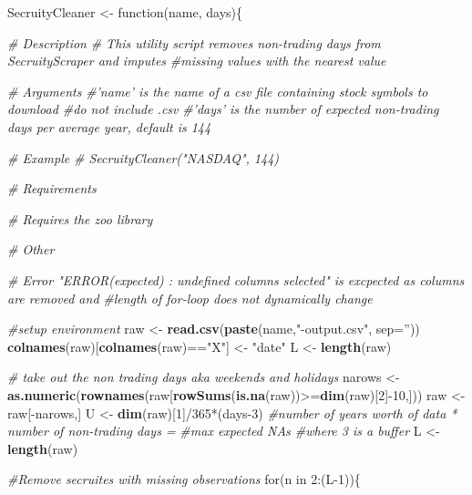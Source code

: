 \documentclass[]{elsarticle} %
\newenvironment{Shaded}{\begin{snugshade}}{\end{snugshade}}
\newcommand{\KeywordTok}[1]{\textcolor[rgb]{0.13,0.29,0.53}{\textbf{{#1}}}}
\newcommand{\DataTypeTok}[1]{\textcolor[rgb]{0.13,0.29,0.53}{{#1}}}
\newcommand{\DecValTok}[1]{\textcolor[rgb]{0.00,0.00,0.81}{{#1}}}
\newcommand{\StringTok}[1]{\textcolor[rgb]{0.31,0.60,0.02}{{#1}}}
\newcommand{\CommentTok}[1]{\textcolor[rgb]{0.56,0.35,0.01}{\textit{{#1}}}}
\newcommand{\NormalTok}[1]{{#1}}
\begin{document}
\begin{Shaded}
\begin{Highlighting}[]
\NormalTok{SecruityCleaner <-}\StringTok{ }\NormalTok{function(name, days)\{}

\CommentTok{# Description}
\CommentTok{# This utility script removes non-trading days from SecruityScraper and imputes }
  \CommentTok{#missing values with the nearest value }

\CommentTok{# Arguments}
\CommentTok{#'name' is the name of a csv file containing stock symbols to download #do not include .csv}
\CommentTok{#'days' is the number of expected non-trading days per average year, default is 144}

\CommentTok{# Example}
\CommentTok{# SecruityCleaner("NASDAQ", 144)}

\CommentTok{# Requirements}

\CommentTok{# Requires the zoo library}

\CommentTok{# Other}

\CommentTok{# Error "ERROR(expected) : undefined columns selected" is excpected as columns are removed and }
  \CommentTok{#length of for-loop does not dynamically change}

\CommentTok{#setup environment}
\NormalTok{raw <-}\StringTok{ }\KeywordTok{read.csv}\NormalTok{(}\KeywordTok{paste}\NormalTok{(name,}\StringTok{"-output.csv"}\NormalTok{, }\DataTypeTok{sep=}\StringTok{''}\NormalTok{))}
\KeywordTok{colnames}\NormalTok{(raw)[}\KeywordTok{colnames}\NormalTok{(raw)==}\StringTok{"X"}\NormalTok{] <-}\StringTok{ "date"}
\NormalTok{L <-}\StringTok{ }\KeywordTok{length}\NormalTok{(raw)}

\CommentTok{# take out the non trading days aka weekends and holidays}
\NormalTok{narows <-}\StringTok{ }\KeywordTok{as.numeric}\NormalTok{(}\KeywordTok{rownames}\NormalTok{(raw[}\KeywordTok{rowSums}\NormalTok{(}\KeywordTok{is.na}\NormalTok{(raw))>=}\KeywordTok{dim}\NormalTok{(raw)[}\DecValTok{2}\NormalTok{]-}\DecValTok{10}\NormalTok{,])) }
\NormalTok{raw <-}\StringTok{ }\NormalTok{raw[-narows,]}
\NormalTok{U <-}\StringTok{ }\KeywordTok{dim}\NormalTok{(raw)[}\DecValTok{1}\NormalTok{]/}\DecValTok{365}\NormalTok{*(days}\DecValTok{-3}\NormalTok{) }\CommentTok{#number of years worth of data * number of non-trading days = }
\CommentTok{#max expected NAs #where 3 is a buffer}
\NormalTok{L <-}\StringTok{ }\KeywordTok{length}\NormalTok{(raw)}

\CommentTok{#Remove secruites with missing observations}
\NormalTok{for(n in }\DecValTok{2}\NormalTok{:(L}\DecValTok{-1}\NormalTok{))\{}


\end{Highlighting}
\end{Shaded}
\end{document}
